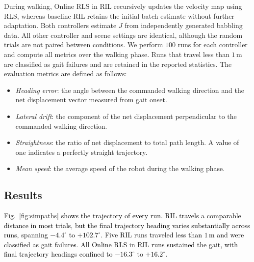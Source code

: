 \documentclass[a4paper, 10pt, conference]{ieeeconf}
\newcommand{\Jm}{J}
\newcommand{\oldtext}[1]{\textcolor{red}{}}
\newcommand{\newtext}[1]{\textcolor{black}{#1}}
\begin{document}
During walking, Online RLS in RIL recursively updates the velocity map using RLS, whereas baseline RIL retains the initial batch estimate without further adaptation.
Both controllers estimate $\Jm$ from independently generated babbling data. All other controller and scene settings are identical, although the random trials are not paired between conditions.
We perform $100$ runs for each controller and compute all metrics over the walking phase.
Runs that travel less than $1$\,m are classified as gait failures and are retained in the reported statistics.
The evaluation metrics are defined as follows:
\begin{itemize}
    \item \emph{Heading error}: the angle between the commanded walking direction and the net displacement vector measured from gait onset.
    \item \emph{Lateral drift}: the component of the net displacement perpendicular to the commanded walking direction.
    \item \emph{Straightness}: the ratio of net displacement to total path length. A value of one indicates a perfectly straight trajectory.
    \item \emph{Mean speed}: the average speed of the robot during the walking phase.
\end{itemize}

\subsection{Results}

\newtext{Fig.~\ref{fig:simpaths} shows the trajectory of every run. RIL travels a
comparable distance in most trials, but the final trajectory heading varies
substantially across runs, spanning $-4.4^\circ$ to $+102.7^\circ$. Five RIL
runs traveled less than $1$\,m and were classified as gait failures. All Online RLS in RIL runs sustained the gait, with final trajectory headings confined to
$-16.3^\circ$ to $+16.2^\circ$.}
\end{document}
